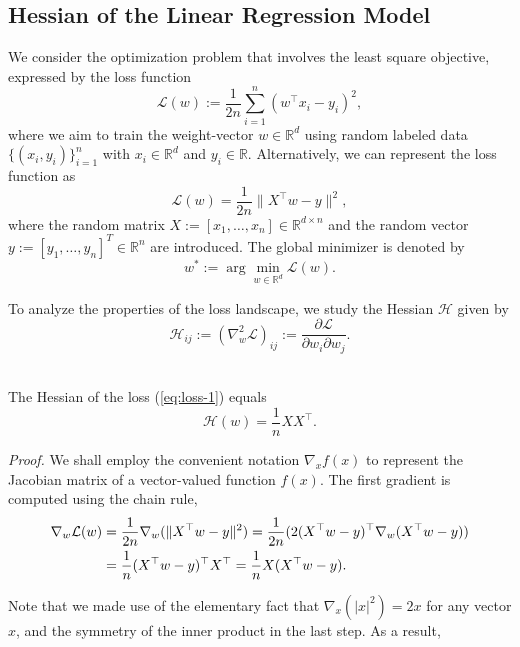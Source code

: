 \documentclass{article}
\begin{document}
\subsection{Hessian of the Linear Regression Model}
We consider the optimization problem that involves the least square objective, expressed by the loss function
\begin{equation}
\mathcal{L}(w):=\frac{1}{2n}\sum_{i=1}^n(w^\top x_i-y_i)^2,\label{eq:loss-1}
\end{equation}
where we aim to train the weight-vector $w\in\mathbb{R}^d$ using random labeled data $\{(x_i,y_i)\}_{i=1}^n$ with $x_i\in\mathbb{R}^d$ and $y_i\in\mathbb{R}$. Alternatively, we can represent the loss function as
\begin{equation}
\mathcal{L}(w)=\frac{1}{2n}\|X^\top w-y\|^2,
\end{equation}
where the random matrix $X:=[x_1,\dots,x_n]\in\mathbb{R}^{d\times n}$ and the random vector $y:=[y_1,\dots,y_n]^T\in\mathbb{R}^n$ are introduced. The global minimizer is denoted by
\begin{equation}
w^*:=\arg\min_{w\in\mathbb{R}^d}\mathcal{L}(w).\end{equation}
\par
To analyze the properties of the loss landscape, we study the Hessian $\mathcal{H}$ given by
\begin{equation}
\mathcal{H}_{ij}:=(\nabla_w^2\mathcal{L})_{ij}:=\frac{\partial\mathcal{L}}{\partial w_i\partial w_j}.
\end{equation}
\smallskip
\\
\begin{proposition}\label{thm:covariance}
The Hessian of the loss (\ref{eq:loss-1}) equals
$$\mathcal{H}(w)=\frac{1}{n}X X^\top.$$
\end{proposition}
\smallskip
\noindent
\emph{Proof.} We shall employ the convenient notation $\nabla_x f(x)$ to represent the Jacobian matrix of a vector-valued function $f(x)$. The first gradient is computed using the chain rule,
\begin{align}
\nabla_w\mathcal{L}(w) &= \frac{1}{2n}\nabla_w(\|X^\top w-y\|^2) = \frac{1}{2n}(2(X^\top w-y)^\top\nabla_w(X^\top w-y)) \notag
\\&= \frac{1}{n}(X^\top w-y)^\top X^\top = \frac{1}{n}X(X^\top w-y).
\end{align}
\par
Note that we made use of the elementary fact that $\nabla_x(|x|^2)=2x$ for any vector $x$, and the symmetry of the inner product in the last step. As a result,
\end{document}
